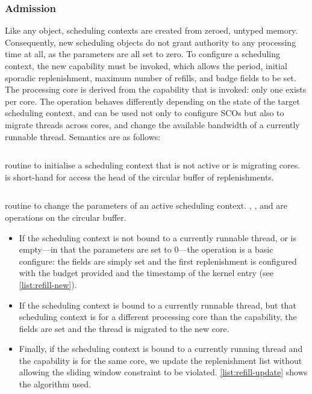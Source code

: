 \subsubsection{Admission}

Like any \selfour object, scheduling contexts are created from zeroed, untyped memory. Consequently,
new scheduling objects do not grant authority to any processing time at all, as the parameters are
all set to zero. To configure a scheduling context, the new \schedcontrol capability must be
invoked, which allows the period, initial sporadic replenishment, maximum number of refills, and
badge fields to be set. The processing core is derived from the \schedcontrol capability
that is invoked: only one exists per core. 
The \schedcontrolconfigure operation behaves differently depending on the state of the target scheduling
context, and can be used not only to configure \glspl{SCO} but also to migrate threads across cores, and
change the available bandwidth of a currently runnable thread. 
\clearpage
Semantics are as follows:

\begin{listing}[t]
    \inputminted{c}{code/refill_new.c}
    \caption[Refill new routine.]{ routine to initialise a scheduling context that is not active or is
    migrating cores.  is short-hand for access the head of the circular buffer of
    replenishments.}
    \label{list:refill-new}
    \inputminted{c}{code/refill_update.c}
    \caption[Refill update routine.]{ routine to change the parameters of an
            active scheduling context. , , and  are operations on 
            the circular buffer.}
\label{list:refill-update}
\end{listing}

\begin{itemize}
\item If the scheduling context is not bound
to a currently runnable thread, or is empty---in that the parameters are set to 0---the operation is 
a basic configure: the fields are
simply set and the first replenishment is configured with the budget provided and the timestamp of the
kernel entry (see \cref{list:refill-new}).
\item If the scheduling context is bound to a currently runnable thread, but that scheduling
context is for a different processing core than the \schedcontrol capability, the fields are
set and the thread is migrated to the new core.  
\item Finally, if the scheduling context is bound to a currently running thread and the
    \schedcontrol capability is for the same core, we update the replenishment list without
    allowing the sliding window constraint to be violated. \cref{list:refill-update} shows the
    algorithm used.
\end{itemize}

